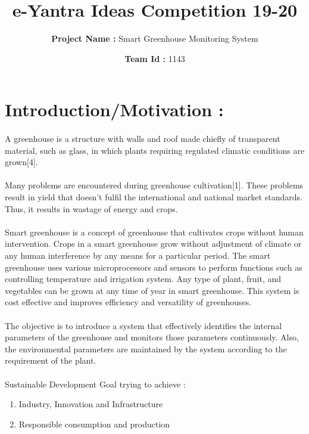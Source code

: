 \documentclass[12pt]{extarticle}
\title{\textbf{e-Yantra Ideas Competition 19-20}}
\author{\textbf{Project Name : }Smart Greenhouse Monitoring System}
\date{\textbf{Team Id : }1143}
\begin{document}
\maketitle
{}

\section{Introduction/Motivation : }
\paragraph{}
A greenhouse is a structure with walls and roof made chiefly of transparent material, such as glass, in which plants requiring regulated climatic conditions are grown[4].
\paragraph{}
Many problems are encountered during greenhouse cultivation[1]. These problems result in yield that doesn’t fulfil the international and national market standards. Thus, it results in wastage of energy and crops. 
\paragraph{}
Smart greenhouse is a concept of greenhouse that cultivates crops without human intervention. Crops in a smart greenhouse grow without adjustment of climate or any human interference by any means for a particular period. The smart greenhouse uses various microprocessors and sensors to perform functions such as controlling temperature and irrigation system. Any type of plant, fruit, and vegetables can be grown at any time of year in smart greenhouse. This system is cost effective and improves efficiency and versatility of greenhouses.
\paragraph{}
The objective is to introduce a system that effectively identifies the internal parameters of the greenhouse and monitors those parameters continuously. Also, the environmental parameters are maintained by the system according to the requirement of the plant.
\paragraph{}
Sustainable Development Goal trying to achieve :
\begin{enumerate}
    \item Industry, Innovation and Infrastructure
    \item Responsible consumption and production
\end{enumerate}
\end{document}
